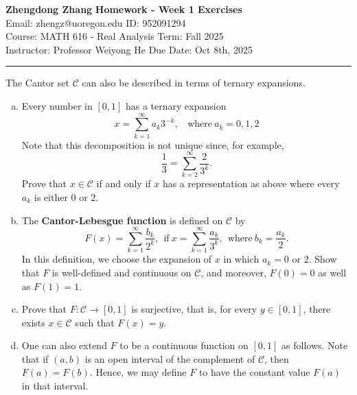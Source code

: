 \documentclass[letterpaper, 12pt]{article}
\begin{document}
\noindent
\large\textbf{Zhengdong Zhang} \hfill \textbf{Homework - Week 1 Exercises}   \\
Email: zhengz@uoregon.edu \hfill ID: 952091294 \\
\normalsize Course: MATH 616 - Real Analysis \hfill Term: Fall 2025 \\
Instructor: Professor Weiyong He \hfill Due Date: Oct 8th, 2025 \\
\noindent\rule{7in}{2.8pt}
\begin{problem}{1.2}
The Cantor set \(\mathcal{C}\) can also be described in terms of ternary expansions.
\begin{enumerate}[(a)]
    \item Every number in \([0,1]\) has a ternary expansion 
          \[x=\sum_{k=1}^\infty a_k 3^{-k},\ \ \ \ \text{where}\ a_k=0,1,2\]
          Note that this decomposition is not unique since, for example, 
          \[\frac{1}{3}=\sum_{k=2}^\infty \frac{2}{3^k}.\]
          Prove that \(x\in \mathcal{C}\) if and only if \(x\) has a representation as above where every \(a_k\) is either \(0\) or \(2\). 
    \item The \textbf{Cantor-Lebesgue function} is defined on \(\mathcal{C}\) by 
          \[F(x)=\sum_{k=1}^\infty \frac{b_k}{2^k},\ \ \text{if}\ x=\sum_{k=1}^\infty \frac{a_k}{3^k},\ \ \text{where}\ b_k=\frac{a_k}{2}.\]
          In this definition, we choose the expansion of \(x\) in which \(a_k=0\) or \(2\). Show that \(F\) is well-defined and continuous on \(\mathcal{C}\), and moreover, \(F(0)=0\) as well as \(F(1)=1\).
    \item Prove that \(F:\mathcal{C}\rightarrow [0,1]\) is surjective, that is, for every \(y\in [0,1]\), there exists \(x\in \mathcal{C}\) such that \(F(x)=y\).
    \item One can also extend \(F\) to be a continuous function on \([0,1]\) as follows. Note that if \((a,b)\) is an open interval of the complement of \(\mathcal{C}\), then \(F(a)=F(b)\). Hence, we may define \(F\) to have the constant value \(F(a)\) in that interval. 
\end{enumerate}
\end{problem}
\end{document}
